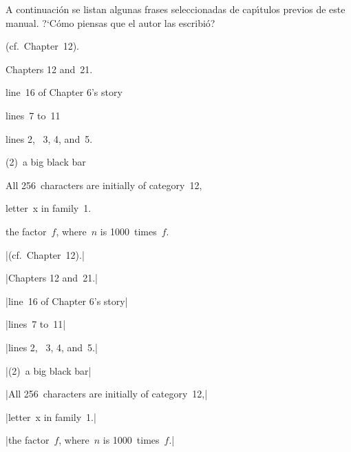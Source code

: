 


\bigskip

\enunciadoS A continuaci\'on se listan algunas frases seleccionadas de
cap\'{\i}tulos previos de este manual. ?`C\'omo piensas que el autor
las escribi\'o?

(cf.~Chapter~12).

Chapters 12 and~21.

line~16 of Chapter 6's story

lines~7 to~11

lines 2,~ 3, 4, and~5.

(2)~a big black bar

All 256~characters are initially of category~12,

letter~x in family~1.

the factor~$f$, where~$n$ is 1000~times~$f$.

\bigskip

\respuestaS

|(cf.~Chapter~12).|

|Chapters 12 and~21.|

|line~16 of Chapter 6's story|

|lines~7 to~11|

|lines 2,~ 3, 4, and~5.|

|(2)~a big black bar|

|All 256~characters are initially of category~12,|

|letter~x in family~1.|

|the factor~$f$, where~$n$ is 1000~times~$f$.|

\bye

